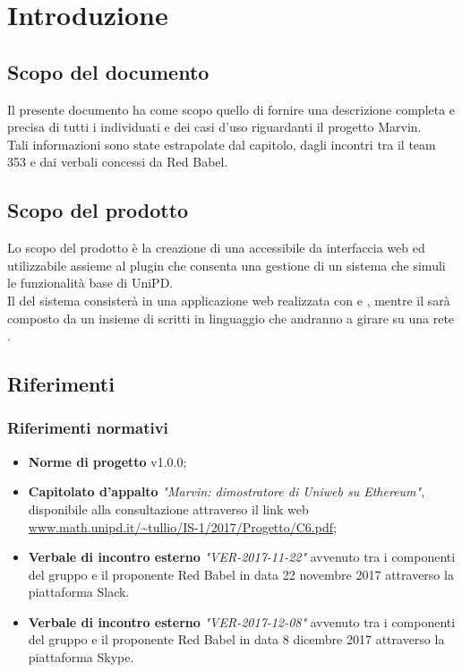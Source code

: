 \documentclass[AnalisiDeiRequisiti.tex]{subfiles}
\begin{document}
\chapter{Introduzione}
\section{Scopo del documento}
Il presente documento ha come scopo quello di fornire una descrizione completa e precisa di tutti i  individuati e dei casi d'uso riguardanti il progetto Marvin.\\
Tali informazioni sono state estrapolate dal capitolo, dagli incontri tra il team 353 e dai verbali concessi da Red Babel.

\section{Scopo del prodotto}
Lo scopo del prodotto è la creazione di una  accessibile da interfaccia web ed utilizzabile assieme al plugin  che consenta una gestione di un sistema che simuli le funzionalità base di UniPD.\\
Il  del sistema consisterà in una applicazione web realizzata con  e , mentre il  sarà composto da un insieme di  scritti in linguaggio  che andranno a girare su una rete .\\

\glossExpl

\section{Riferimenti}

\subsection{Riferimenti normativi}

\begin{itemize}
	\item \textbf{Norme di progetto} v1.0.0;\\
	\item \textbf{Capitolato d'appalto} \textit{"Marvin: dimostratore di Uniweb su Ethereum"}, disponibile alla consultazione attraverso il link web \url{www.math.unipd.it/~tullio/IS-1/2017/Progetto/C6.pdf};\\
	\item \textbf{Verbale di incontro esterno} \textit{"VER-2017-11-22"} avvenuto tra i componenti del gruppo e il proponente Red Babel in data 22 novembre 2017 attraverso la piattaforma Slack.
	\item \textbf{Verbale di incontro esterno} \textit{"VER-2017-12-08"} avvenuto tra i componenti del gruppo e il proponente Red Babel in data 8 dicembre 2017 attraverso la piattaforma Skype.
\end{itemize}
\end{document}
